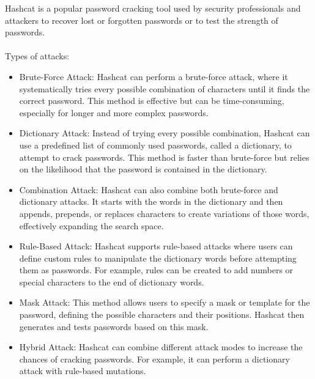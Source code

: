 \documentclass[10pt,oneside,english,a4paper]{article}
\begin{document}
Hashcat is a popular password cracking tool used by security professionals and attackers to recover lost or forgotten passwords or to test the strength of passwords.
\\\\
Types of attacks:
\begin{itemize}
\item Brute-Force Attack: Hashcat can perform a brute-force attack, where it systematically tries every possible combination of characters until it finds the correct password. This method is effective but can be time-consuming, especially for longer and more complex passwords.

\item Dictionary Attack: Instead of trying every possible combination, Hashcat can use a predefined list of commonly used passwords, called a dictionary, to attempt to crack passwords. This method is faster than brute-force but relies on the likelihood that the password is contained in the dictionary.

\item Combination Attack: Hashcat can also combine both brute-force and dictionary attacks. It starts with the words in the dictionary and then appends, prepends, or replaces characters to create variations of those words, effectively expanding the search space.
    
\item Rule-Based Attack: Hashcat supports rule-based attacks where users can define custom rules to manipulate the dictionary words before attempting them as passwords. For example, rules can be created to add numbers or special characters to the end of dictionary words.
    
\item Mask Attack: This method allows users to specify a mask or template for the password, defining the possible characters and their positions. Hashcat then generates and tests passwords based on this mask.
    
\item Hybrid Attack: Hashcat can combine different attack modes to increase the chances of cracking passwords. For example, it can perform a dictionary attack with rule-based mutations.

\end{itemize}





\clearpage
\end{document}
